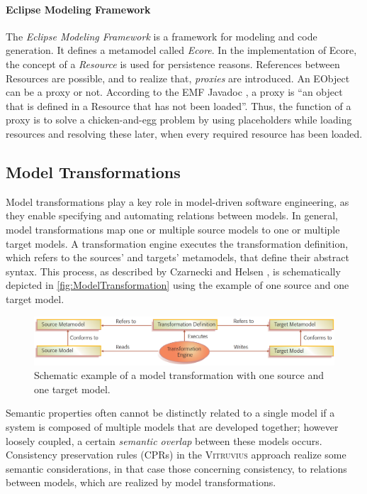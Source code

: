 \paragraph{Eclipse Modeling Framework}
The \emph{Eclipse Modeling Framework} \cite{steinberg_emf_2008} is a framework for modeling and code generation. 
It defines a metamodel called \emph{Ecore}.
In the implementation of Ecore, the concept of a \emph{Resource} is used for persistence reasons.
References between Resources are possible, and to realize that, \emph{proxies} are introduced.
An EObject can be a proxy or not. According to the EMF Javadoc \cite{noauthor_emf_eobject_nodate}, a proxy is \enquote{an object that is defined in a Resource that has not been loaded}.
Thus, the function of a proxy is to solve a chicken-and-egg problem by using placeholders while loading resources and resolving these later, when every required resource has been loaded.

\subsection{Model Transformations}
\label{sec:Foundations:ModelTransformations}
Model transformations play a key role in model-driven software engineering, as they enable specifying and automating relations between models.
In general, model transformations map one or multiple source models to one or multiple target models.
A transformation engine executes the transformation definition, which refers to the sources' and targets' metamodels, that define their abstract syntax.
This process, as described by Czarnecki and Helsen \cite{czarnecki_helsen_feature_based_survey_2006}, is schematically depicted in \autoref{fig:ModelTransformation} using the example of one source and one target model.

\begin{figure}
\centering
\includegraphics[width=13cm]{figures/model_transformation.png}
\caption{Schematic example of a model transformation with one source and one target model.\cite{czarnecki_helsen_feature_based_survey_2006}}
\label{fig:ModelTransformation}
\end{figure}

Semantic properties often cannot be distinctly related to a single model if a system is composed of multiple models that are developed together; however loosely coupled, a certain \emph{semantic overlap} between these models occurs. Consistency preservation rules (CPRs) in the \textsc{Vitruvius} approach \cite{VitruviusKlare2021} realize some semantic considerations, in that case those concerning consistency, to relations between models, which are realized by model transformations.


